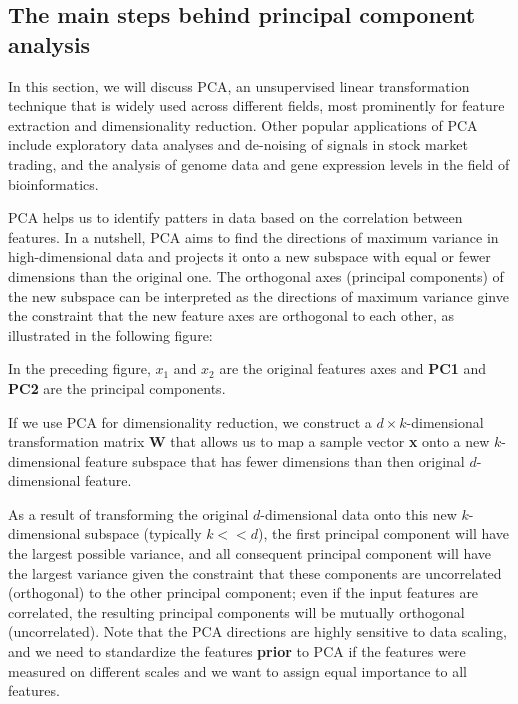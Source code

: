 \documentclass[11pt]{article}
\begin{document}
    \subsection{The main steps behind principal component
analysis}\label{the-main-steps-behind-principal-component-analysis}

    In this section, we will discuss PCA, an unsupervised linear
transformation technique that is widely used across different fields,
most prominently for feature extraction and dimensionality reduction.
Other popular applications of PCA include exploratory data analyses and
de-noising of signals in stock market trading, and the analysis of
genome data and gene expression levels in the field of bioinformatics.

PCA helps us to identify patters in data based on the correlation
between features. In a nutshell, PCA aims to find the directions of
maximum variance in high-dimensional data and projects it onto a new
subspace with equal or fewer dimensions than the original one. The
orthogonal axes (principal components) of the new subspace can be
interpreted as the directions of maximum variance ginve the constraint
that the new feature axes are orthogonal to each other, as illustrated
in the following figure:

    In the preceding figure, \(x_1\) and \(x_2\) are the original features
axes and \textbf{PC1} and \textbf{PC2} are the principal components.

If we use PCA for dimensionality reduction, we construct a
\(d \times k\)-dimensional transformation matrix \textbf{W} that allows
us to map a sample vector \textbf{x} onto a new \(k\)-dimensional
feature subspace that has fewer dimensions than then original
\(d\)-dimensional feature.

As a result of transforming the original \(d\)-dimensional data onto
this new \(k\)-dimensional subspace (typically \(k << d\)), the first
principal component will have the largest possible variance, and all
consequent principal component will have the largest variance given the
constraint that these components are uncorrelated (orthogonal) to the
other principal component; even if the input features are correlated,
the resulting principal components will be mutually orthogonal
(uncorrelated). Note that the PCA directions are highly sensitive to
data scaling, and we need to standardize the features \textbf{prior} to
PCA if the features were measured on different scales and we want to
assign equal importance to all features.
\end{document}
